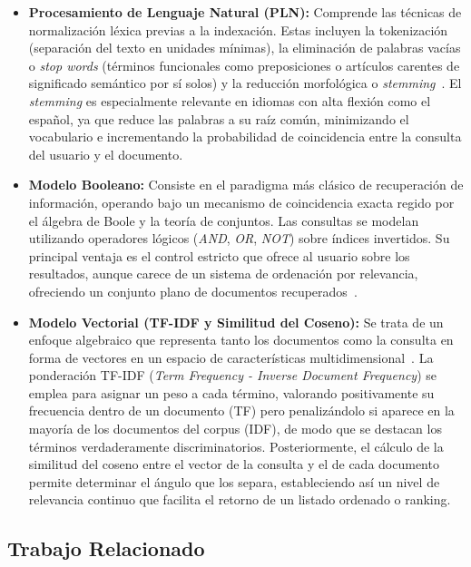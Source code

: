 \documentclass[conference,a4paper]{IEEEtran}
\begin{document}
\begin{itemize}
    \item \textbf{Procesamiento de Lenguaje Natural (PLN):} Comprende las técnicas de 
    normalización léxica previas a la indexación. Estas incluyen la tokenización (separación 
    del texto en unidades mínimas), la eliminación de palabras vacías o \textit{stop words} 
    (términos funcionales como preposiciones o artículos carentes de significado semántico por 
    sí solos) y la reducción morfológica o \textit{stemming}~\cite{b3}. El \textit{stemming} 
    es especialmente relevante en idiomas con alta flexión como el español, ya que reduce las 
    palabras a su raíz común, minimizando el vocabulario e incrementando la probabilidad de 
    coincidencia entre la consulta del usuario y el documento.
    
    \item \textbf{Modelo Booleano:} Consiste en el paradigma más clásico de recuperación 
    de información, operando bajo un mecanismo de coincidencia exacta regido por el 
    álgebra de Boole y la teoría de conjuntos. Las consultas se modelan utilizando operadores 
    lógicos (\textit{AND}, \textit{OR}, \textit{NOT}) sobre índices invertidos. Su principal 
    ventaja es el control estricto que ofrece al usuario sobre los resultados, aunque carece 
    de un sistema de ordenación por relevancia, ofreciendo un conjunto plano de 
    documentos recuperados~\cite{b1}.
    
    \item \textbf{Modelo Vectorial (TF-IDF y Similitud del Coseno):} Se trata de un 
    enfoque algebraico que representa tanto los documentos como la consulta en 
    forma de vectores en un espacio de características multidimensional~\cite{b1}. La 
    ponderación TF-IDF (\textit{Term Frequency - Inverse Document Frequency}) se emplea para 
    asignar un peso a cada término, valorando positivamente su frecuencia dentro de un documento 
    (TF) pero penalizándolo si aparece en la mayoría de los documentos del corpus (IDF), de 
    modo que se destacan los términos verdaderamente discriminatorios. Posteriormente, el cálculo de 
    la similitud del coseno entre el vector de la consulta y el de cada documento permite determinar 
    el ángulo que los separa, estableciendo así un nivel de relevancia continuo que facilita el 
    retorno de un listado ordenado o ranking.
\end{itemize}

\subsection{Trabajo Relacionado}
\end{document}
